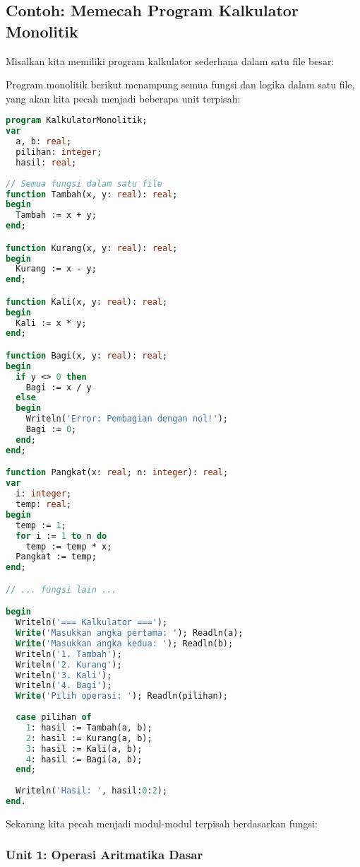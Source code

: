 \documentclass[../main.tex]{subfiles}
\begin{document}
\subsection{Contoh: Memecah Program Kalkulator Monolitik}

Misalkan kita memiliki program kalkulator sederhana dalam satu file besar:

Program monolitik berikut menampung semua fungsi dan logika dalam satu file, yang akan kita pecah menjadi beberapa unit terpisah:

\begin{lstlisting}[language=Pascal, caption={Program monolitik (kalkulator\_monolitik.pas)}]
program KalkulatorMonolitik;
var
  a, b: real;
  pilihan: integer;
  hasil: real;
  
// Semua fungsi dalam satu file
function Tambah(x, y: real): real;
begin
  Tambah := x + y;
end;

function Kurang(x, y: real): real;
begin
  Kurang := x - y;
end;

function Kali(x, y: real): real;
begin
  Kali := x * y;
end;

function Bagi(x, y: real): real;
begin
  if y <> 0 then
    Bagi := x / y
  else
  begin
    Writeln('Error: Pembagian dengan nol!');
    Bagi := 0;
  end;
end;

function Pangkat(x: real; n: integer): real;
var
  i: integer;
  temp: real;
begin
  temp := 1;
  for i := 1 to n do
    temp := temp * x;
  Pangkat := temp;
end;

// ... fungsi lain ...

begin
  Writeln('=== Kalkulator ===');
  Write('Masukkan angka pertama: '); Readln(a);
  Write('Masukkan angka kedua: '); Readln(b);
  Writeln('1. Tambah');
  Writeln('2. Kurang');
  Writeln('3. Kali');
  Writeln('4. Bagi');
  Write('Pilih operasi: '); Readln(pilihan);
  
  case pilihan of
    1: hasil := Tambah(a, b);
    2: hasil := Kurang(a, b);
    3: hasil := Kali(a, b);
    4: hasil := Bagi(a, b);
  end;
  
  Writeln('Hasil: ', hasil:0:2);
end.
\end{lstlisting}

Sekarang kita pecah menjadi modul-modul terpisah berdasarkan fungsi:

\subsubsection{Unit 1: Operasi Aritmatika Dasar}
\end{document}
